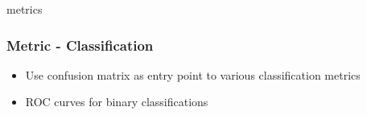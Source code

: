 \documentclass[xcolor=x11names,compress]{beamer}
\begin{document}
\begin{frame}{metrics}
    \frametitle{Metric - Classification}

    \begin{itemize}
        \item<2-> Use confusion matrix as entry point to various classification metrics
        \item<3-> ROC curves for binary classifications

    \end{itemize}

\end{frame}
\end{document}
